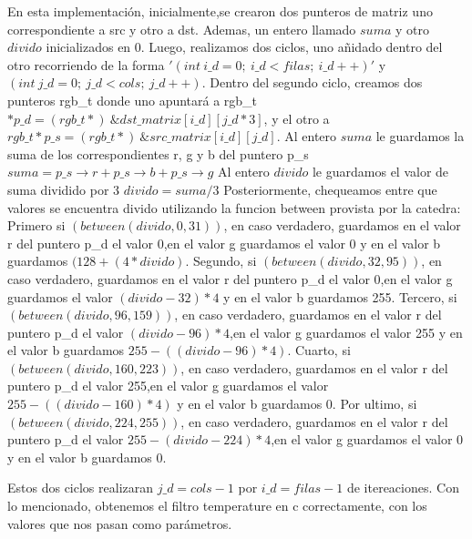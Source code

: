 En esta implementación, inicialmente,se crearon dos punteros de matriz uno correspondiente a src y otro a dst.\newline 
Ademas, un entero llamado $suma$ y otro $divido$ inicializados en 0. \newline
Luego, realizamos dos ciclos, uno añidado dentro del otro recorriendo de la forma $'(int\ i\_d = 0;\ i\_d < filas;\ i\_d++)'$ y 
$(int\ j\_d = 0;\ j\_d < cols;\ j\_d++)$.\newline
Dentro del segundo ciclo, creamos dos punteros rgb\_t donde uno apuntará a \newline rgb\_t $*p\_d = (rgb\_t*)\  \&dst\_matrix[i\_d][j\_d*3]$, y el otro
a $rgb\_t *p\_s = (rgb\_t*)\ \&src\_matrix[i\_d][j\_d]$.\newline
Al entero $suma$ le guardamos la suma de los correspondientes r, g y b del puntero p\_s $suma = p\_s\rightarrow r + p\_s\rightarrow b + p\_s\rightarrow g$
Al entero $divido$ le guardamos el valor de suma dividido por 3 $ divido = suma/3$
Posteriormente, chequeamos entre que valores se encuentra divido utilizando la funcion between provista por la catedra:\vspace*{0.3cm} \noindent\newline 
Primero si $(between(divido,0,31))$, en caso verdadero, guardamos en el valor r del puntero p\_d el valor 0,en el valor g 
guardamos el valor 0 y en el valor b guardamos $(128+ (4*divido)$. \newline 
Segundo, si $(between(divido,32,95))$, en caso verdadero, guardamos en el valor r del puntero p\_d el valor 0,en el valor g 
guardamos el valor $(divido-32)*4$ y en el valor b guardamos 255. \newline Tercero, si $(between(divido,96,159))$, en caso verdadero, guardamos en el valor r del puntero p\_d el valor $(divido-96)*4$,en el valor g 
guardamos el valor 255 y en el valor b guardamos $255-((divido-96)*4)$. \newline Cuarto, si $(between(divido,160,223))$, en caso verdadero, guardamos en el valor r del puntero p\_d el valor 255,en el valor g 
guardamos el valor $255 - ((divido-160)*4)$ y en el valor b guardamos 0. \newline  Por ultimo, si $(between(divido,224,255))$, en caso verdadero, guardamos en el valor r del puntero p\_d el valor $255-(divido-224)*4$,en el valor g 
guardamos el valor 0 y en el valor b guardamos 0. \newline 

Estos dos ciclos realizaran $j\_d = cols - 1$  por $i\_d = filas -1$ de itereaciones.\newline
Con lo mencionado, obtenemos el filtro temperature en c correctamente, con los valores que nos pasan como parámetros.\newline

